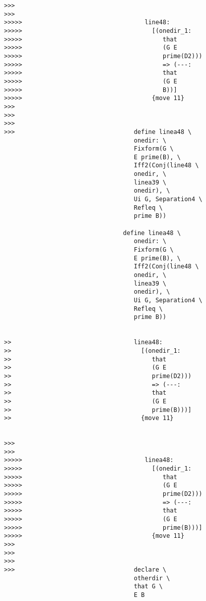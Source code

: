 \documentclass[12pt]{article}
\begin{document}
\begin{verbatim}
>>>
>>>
>>>>>                                  line48:
>>>>>                                    [(onedir_1:
>>>>>                                       that
>>>>>                                       (G E
>>>>>                                       prime(D2)))
>>>>>                                       => (---:
>>>>>                                       that
>>>>>                                       (G E
>>>>>                                       B))]
>>>>>                                    {move 11}
>>>
>>>
>>>
>>>                                 define linea48 \
                                    onedir: \
                                    Fixform(G \
                                    E prime(B), \
                                    Iff2(Conj(line48 \
                                    onedir, \
                                    linea39 \
                                    onedir), \
                                    Ui G, Separation4 \
                                    Refleq \
                                    prime B))

                                 define linea48 \
                                    onedir: \
                                    Fixform(G \
                                    E prime(B), \
                                    Iff2(Conj(line48 \
                                    onedir, \
                                    linea39 \
                                    onedir), \
                                    Ui G, Separation4 \
                                    Refleq \
                                    prime B))


>>                                  linea48:
>>                                    [(onedir_1:
>>                                       that
>>                                       (G E
>>                                       prime(D2)))
>>                                       => (---:
>>                                       that
>>                                       (G E
>>                                       prime(B)))]
>>                                    {move 11}


>>>
>>>
>>>>>                                  linea48:
>>>>>                                    [(onedir_1:
>>>>>                                       that
>>>>>                                       (G E
>>>>>                                       prime(D2)))
>>>>>                                       => (---:
>>>>>                                       that
>>>>>                                       (G E
>>>>>                                       prime(B)))]
>>>>>                                    {move 11}
>>>
>>>
>>>
>>>                                 declare \
                                    otherdir \
                                    that G \
                                    E B


\end{verbatim}
\end{document}
